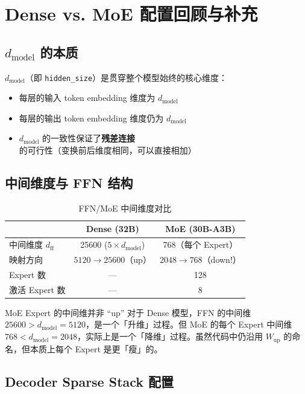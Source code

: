 \documentclass[a4paper]{article}
\begin{document}
\section{Dense vs. MoE 配置回顾与补充}

\subsection{$d_{\text{model}}$ 的本质}

$d_{\text{model}}$（即 \texttt{hidden\_size}）是贯穿整个模型始终的核心维度：
\begin{itemize}
  \item 每层的输入 token embedding 维度为 $d_{\text{model}}$
  \item 每层的输出 token embedding 维度仍为 $d_{\text{model}}$
  \item $d_{\text{model}}$ 的一致性保证了\textbf{残差连接}的可行性（变换前后维度相同，可以直接相加）
\end{itemize}

\subsection{中间维度与 FFN 结构}

\begin{table}[H]
\centering
\caption{FFN/MoE 中间维度对比}
\begin{tabular}{lcc}
\toprule
& \textbf{Dense (32B)} & \textbf{MoE (30B-A3B)} \\
\midrule
中间维度 $d_{\text{ff}}$ & 25600 ($5 \times d_{\text{model}}$) & 768（每个 Expert） \\
映射方向 & $5120 \to 25600$（up） & $2048 \to 768$（down!） \\
Expert 数 & --- & 128 \\
激活 Expert 数 & --- & 8 \\
\bottomrule
\end{tabular}
\end{table}

\begin{warningbox}{MoE Expert 的中间维并非 ``up''}
对于 Dense 模型，FFN 的中间维 $25600 > d_{\text{model}} = 5120$，是一个「升维」过程。但 MoE 的每个 Expert 中间维 $768 < d_{\text{model}} = 2048$，实际上是一个「降维」过程。虽然代码中仍沿用 $W_{\text{up}}$ 的命名，但本质上每个 Expert 是更「瘦」的。
\end{warningbox}

\subsection{Decoder Sparse Stack 配置}
\end{document}

